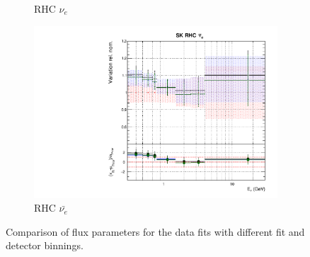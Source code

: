 \begin{figure}[!htbp]
\begin{subfigure}{0.45\textwidth}
  \caption{\SK RHC $\nu_{e}$}
\end{subfigure}
\begin{subfigure}{0.45\textwidth}
  \centering
  \includegraphics[width=0.75\linewidth]{figs/polydataflux_15}
  \caption{\SK RHC $\bar{\nu_e}$}
\end{subfigure}
\caption{Comparison of \SK flux parameters for the data fits with different fit and detector binnings.}
\label{fig:polydatafluxSKapp}
\end{figure}

